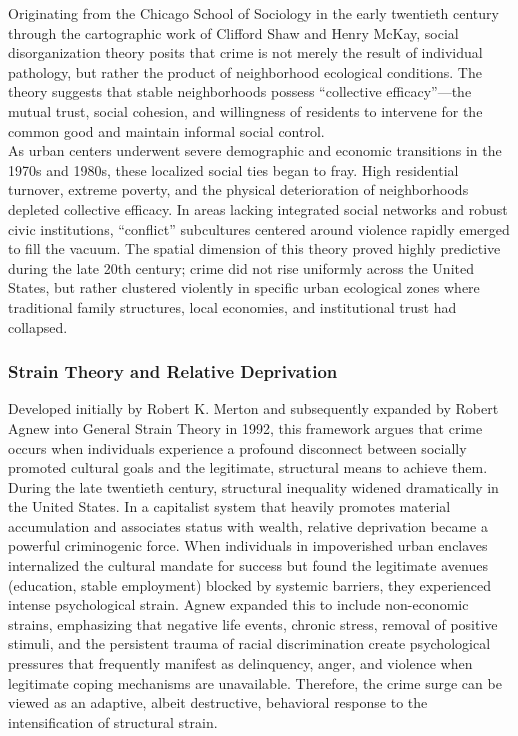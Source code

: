 \documentclass[
]{article}
\begin{document}
Originating from the Chicago School of Sociology in the early twentieth
century through the cartographic work of Clifford Shaw and Henry McKay,
social disorganization theory posits that crime is not merely the result
of individual pathology, but rather the product of neighborhood
ecological conditions. The theory suggests that stable neighborhoods
possess ``collective efficacy''---the mutual trust, social cohesion, and
willingness of residents to intervene for the common good and maintain
informal social control.\\
As urban centers underwent severe demographic and economic transitions
in the 1970s and 1980s, these localized social ties began to fray. High
residential turnover, extreme poverty, and the physical deterioration of
neighborhoods depleted collective efficacy. In areas lacking integrated
social networks and robust civic institutions, ``conflict'' subcultures
centered around violence rapidly emerged to fill the vacuum. The spatial
dimension of this theory proved highly predictive during the late 20th
century; crime did not rise uniformly across the United States, but
rather clustered violently in specific urban ecological zones where
traditional family structures, local economies, and institutional trust
had collapsed.

\subsubsection{\texorpdfstring{\textbf{Strain Theory and Relative
Deprivation}}{Strain Theory and Relative Deprivation}}\label{strain-theory-and-relative-deprivation}

Developed initially by Robert K. Merton and subsequently expanded by
Robert Agnew into General Strain Theory in 1992, this framework argues
that crime occurs when individuals experience a profound disconnect
between socially promoted cultural goals and the legitimate, structural
means to achieve them.\\
During the late twentieth century, structural inequality widened
dramatically in the United States. In a capitalist system that heavily
promotes material accumulation and associates status with wealth,
relative deprivation became a powerful criminogenic force. When
individuals in impoverished urban enclaves internalized the cultural
mandate for success but found the legitimate avenues (education, stable
employment) blocked by systemic barriers, they experienced intense
psychological strain. Agnew expanded this to include non-economic
strains, emphasizing that negative life events, chronic stress, removal
of positive stimuli, and the persistent trauma of racial discrimination
create psychological pressures that frequently manifest as delinquency,
anger, and violence when legitimate coping mechanisms are unavailable.
Therefore, the crime surge can be viewed as an adaptive, albeit
destructive, behavioral response to the intensification of structural
strain.
\end{document}
